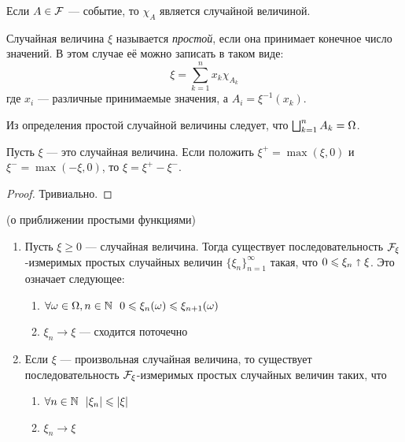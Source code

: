 \begin{exercise}
	Если $A \in \mathcal{F}$ --- событие, то $\chi_A$ является случайной величиной.
\end{exercise}

\begin{definition}
	Случайная величина $\xi$ называется \textit{простой}, если она принимает конечное число значений. В этом случае её можно записать в таком виде:
	\[
		\xi = \sum_{k = 1}^n x_k \chi_{A_k}
	\]
	где $x_i$ --- различные принимаемые значения, а $A_i = \xi^{-1}(x_k)$.
\end{definition}

\begin{note}
	Из определения простой случайной величины следует, что $\bigsqcup_{k = 1}^n A_k = \Omega$.
\end{note}

\begin{proposition}
	Пусть $\xi$ --- это случайная величина. Если положить $\xi^+ = \max(\xi, 0)$ и $\xi^- = \max(-\xi, 0)$, то $\xi = \xi^+ - \xi^-$.
\end{proposition}

\begin{proof}
	Тривиально.
\end{proof}

\begin{theorem} (о приближении простыми функциями)
	\begin{enumerate}
		\item Пусть $\xi \ge 0$ --- случайная величина. Тогда существует последовательность $\mathcal{F}_\xi$-измеримых простых случайных величин $\{\xi_n\}_{n = 1}^\infty$ такая, что $0 \leqslant \xi_n \shortuparrow \xi$. Это означает следующее:
		\begin{enumerate}
			\item $\forall \omega \in \Omega, n \in \N\ \ 0 \le \xi_n(\omega) \le \xi_{n + 1}(\omega)$
			
			\item $\xi_n \to \xi$ --- сходится поточечно
		\end{enumerate}
		
		\item Если $\xi$ --- произвольная случайная величина, то существует последовательность $\mathcal{F}_\xi$-измеримых простых случайных величин таких, что
		\begin{enumerate}
			\item $\forall n \in \mathbb{N}\ \ |\xi_n| \leqslant |\xi|$
			
			\item $\xi_n \to \xi$
		\end{enumerate}
	\end{enumerate}
\end{theorem}

